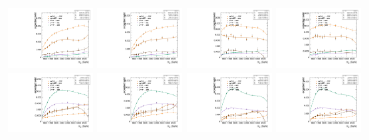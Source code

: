 \begin{figure}[htbp]
  \includegraphics[width=0.2\textwidth]{fig/analysisAppendix/paramSignalYield_NonVBFSig_mu_HP_vbf_LDy.pdf}
  \includegraphics[width=0.2\textwidth]{fig/analysisAppendix/paramSignalYield_NonVBFSig_e_HP_vbf_LDy.pdf}
  \includegraphics[width=0.2\textwidth]{fig/analysisAppendix/paramSignalYield_NonVBFSig_mu_LP_vbf_LDy.pdf}
  \includegraphics[width=0.2\textwidth]{fig/analysisAppendix/paramSignalYield_NonVBFSig_e_LP_vbf_LDy.pdf}\\
  \includegraphics[width=0.2\textwidth]{fig/analysisAppendix/paramSignalYield_NonVBFSig_mu_HP_bb_HDy.pdf}
  \includegraphics[width=0.2\textwidth]{fig/analysisAppendix/paramSignalYield_NonVBFSig_e_HP_bb_HDy.pdf}
  \includegraphics[width=0.2\textwidth]{fig/analysisAppendix/paramSignalYield_NonVBFSig_mu_LP_bb_HDy.pdf}
  \includegraphics[width=0.2\textwidth]{fig/analysisAppendix/paramSignalYield_NonVBFSig_e_LP_bb_HDy.pdf}\\

\end{figure}
